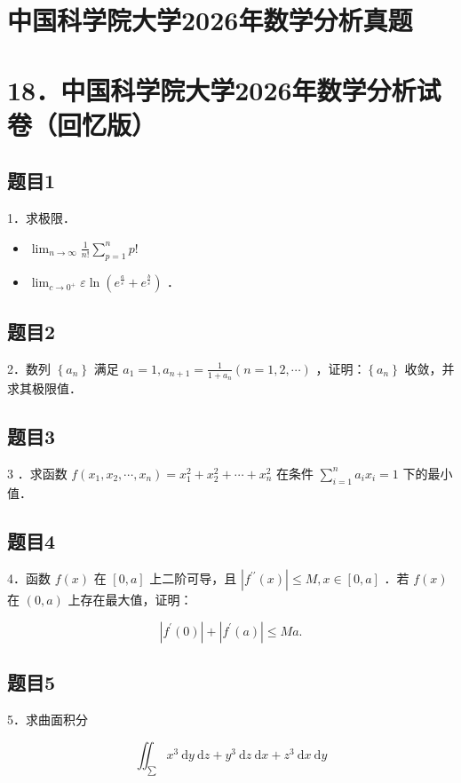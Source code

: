 \documentclass{article}
\begin{document}
\section*{中国科学院大学2026年数学分析真题}
\section*{18．中国科学院大学2026年数学分析试卷（回忆版）}

\subsection{题目1}
1．求极限．

\begin{itemize}
  \item[（1）] \(\lim _{n \rightarrow \infty} \frac{1}{n!} \sum_{p=1}^{n} p!\)
  \item[（2）] \(\lim _{c \rightarrow 0^{+}} \varepsilon \ln \left(e^{\frac{a}{\varepsilon}}+e^{\frac{b}{\varepsilon}}\right)\) ．
\end{itemize}

\subsection{题目2}
2．数列 \(\left\{a_{n}\right\}\) 满足 \(a_{1}=1, a_{n+1}=\frac{1}{1+a_{n}}(n=1,2, \cdots)\) ，证明：\(\left\{a_{n}\right\}\) 收敛，并求其极限值．

\subsection{题目3}
3 ．求函数 \(f\left(x_{1}, x_{2}, \cdots, x_{n}\right)=x_{1}^{2}+x_{2}^{2}+\cdots+x_{n}^{2}\) 在条件 \(\sum_{i=1}^{n} a_{i} x_{i}=1\) 下的最小值．

\subsection{题目4}
4．函数 \(f(x)\) 在 \([0, a]\) 上二阶可导，且 \(\left|f^{\prime \prime}(x)\right| \leq M, x \in[0, a]\) ．若 \(f(x)\) 在 \((0, a)\) 上存在最大值，证明：

\[
\left|f^{\prime}(0)\right|+\left|f^{\prime}(a)\right| \leq M a .
\]

\subsection{题目5}
5．求曲面积分

\[
\iint_{\sum} x^{3} \mathrm{~d} y \mathrm{~d} z+y^{3} \mathrm{~d} z \mathrm{~d} x+z^{3} \mathrm{~d} x \mathrm{~d} y
\]
\end{document}
